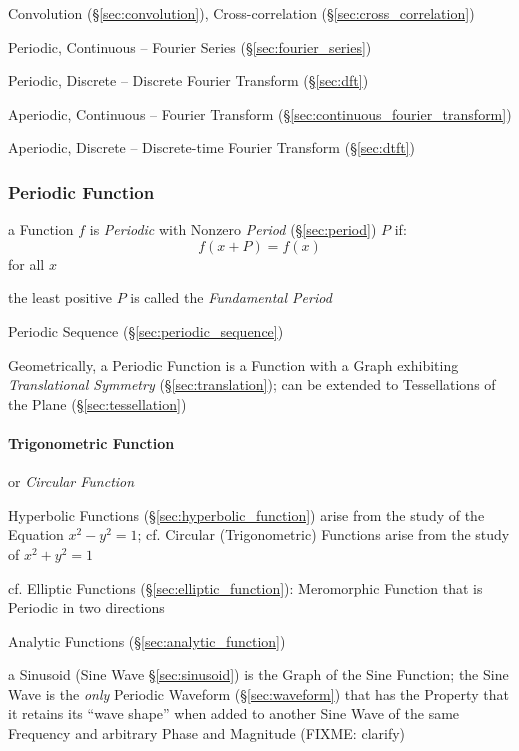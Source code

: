 \fist Convolution (\S\ref{sec:convolution}), Cross-correlation
(\S\ref{sec:cross_correlation})

Periodic, Continuous -- Fourier Series (\S\ref{sec:fourier_series})

Periodic, Discrete -- Discrete Fourier Transform (\S\ref{sec:dft})

Aperiodic, Continuous -- Fourier Transform
  (\S\ref{sec:continuous_fourier_transform})

Aperiodic, Discrete -- Discrete-time Fourier Transform (\S\ref{sec:dtft})



\subsubsection{Periodic Function}\label{sec:periodic_function}

a Function $f$ is \emph{Periodic} with Nonzero \emph{Period}
(\S\ref{sec:period}) $P$ if:
\[
  f(x+P) = f(x)
\]
for all $x$

the least positive $P$ is called the \emph{Fundamental Period}

\fist Periodic Sequence (\S\ref{sec:periodic_sequence})

Geometrically, a Periodic Function is a Function with a Graph exhibiting
\emph{Translational Symmetry} (\S\ref{sec:translation});
can be extended to Tessellations of the Plane (\S\ref{sec:tessellation})



\paragraph{Trigonometric Function}\label{sec:trigonometric_function}\hfill

or \emph{Circular Function}

Hyperbolic Functions (\S\ref{sec:hyperbolic_function}) arise from the study of
the Equation $x^2 - y^2 = 1$; cf. Circular (Trigonometric) Functions arise from
the study of $x^2 + y^2 = 1$

cf. Elliptic Functions (\S\ref{sec:elliptic_function}): Meromorphic Function
that is Periodic in two directions

Analytic Functions (\S\ref{sec:analytic_function})

a Sinusoid (Sine Wave \S\ref{sec:sinusoid}) is the Graph of the Sine Function;
the Sine Wave is the \emph{only} Periodic Waveform (\S\ref{sec:waveform}) that
has the Property that it retains its ``wave shape'' when added to another Sine
Wave of the same Frequency and arbitrary Phase and Magnitude (FIXME: clarify)

